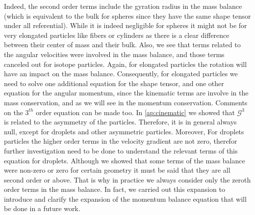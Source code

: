 Indeed, the second order terms include the gyration radius in the mass balance (which is equivalent to the bulk for spheres since they have the same shape tensor under all referential).
While it is indeed negligible for spheres it might not be for very elongated particles like fibers or cylinders as there is a clear difference between their center of mass and their bulk.
Also, we see that terms related to the angular velocities were involved in the mass balance, and those terms canceled out for isotope particles.
Again, for elongated particles the rotation will have an impact on the mass balance.  
Consequently, for elongated particles we need to solve one additional equation for the shape tensor, and one other equation for the angular momentum, since the kinematic terms are involve in the mass conservation, and as we will see in the momentum conservation.  
Comments on the $3^{th}$ order equation can be made too. 
In \ref{ap:cinematic} we showed that $\mathcal{G}^3$ is related to the asymmetry of the particles.
Therefore, it is in general always null, except for droplets and other asymmetric particles. 
Moreover, For droplets particles the higher order terms in the velocity gradient are not zero, therefor further investigation need to be done to understand the relevant terms of this equation for droplets.
Although we showed that some terms of the mass balance were non-zero or zero for certain geometry  it must be said that they are all second order or above.
That is why in practice we always consider only the zeroth order terms in the mass balance. 
In fact, we carried out this expansion to introduce and clarify the expansion of the momentum balance equation that will be done in a future work. 

